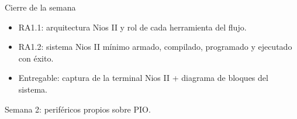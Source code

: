 \documentclass[11pt]{beamer}
\begin{document}
\begin{frame}{Cierre de la semana}
  \begin{itemize}
    \item RA1.1: arquitectura Nios II y rol de cada herramienta del flujo.
    \item RA1.2: sistema Nios II mínimo armado, compilado, programado y ejecutado con éxito.
    \item Entregable: captura de la terminal Nios II + diagrama de bloques del sistema.
  \end{itemize}
  \vfill
  \centering \Large Semana 2: periféricos propios sobre PIO.
\end{frame}
\end{document}
